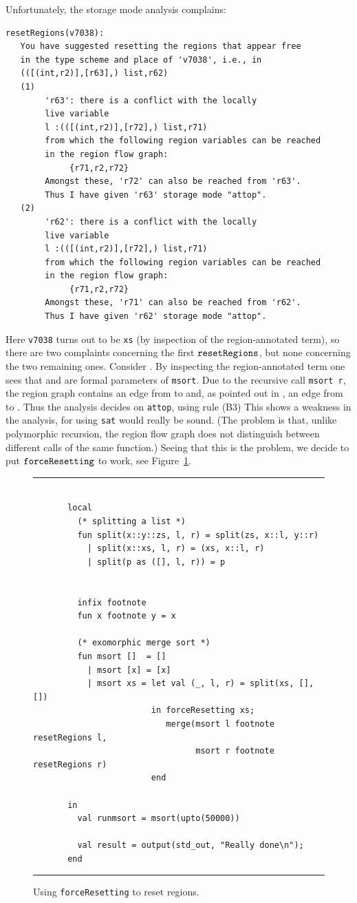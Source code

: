 \documentclass[12pt]{book}
\begin{document}
Unfortunately, the storage mode analysis complains:
\begin{verbatim}
resetRegions(v7038): 
   You have suggested resetting the regions that appear free 
   in the type scheme and place of 'v7038', i.e., in
   (([(int,r2)],[r63],) list,r62)
   (1)                                                    
        'r63': there is a conflict with the locally
        live variable
        l :(([(int,r2)],[r72],) list,r71)
        from which the following region variables can be reached 
        in the region flow graph:
             {r71,r2,r72}
        Amongst these, 'r72' can also be reached from 'r63'.
        Thus I have given 'r63' storage mode "attop".
   (2)                                                    
        'r62': there is a conflict with the locally
        live variable
        l :(([(int,r2)],[r72],) list,r71)
        from which the following region variables can be reached 
        in the region flow graph:
             {r71,r2,r72}
        Amongst these, 'r71' can also be reached from 'r62'.
        Thus I have given 'r62' storage mode "attop".
\end{verbatim}
Here {\tt v7038} turns out to be {\tt xs} (by inspection of the
region-annotated term), so there are two complaints
concerning the first $\hbox{\tt resetRegions}$, but none concerning the two remaining
ones.  Consider . By inspecting the region-annotated term
one sees that  and  are formal parameters of
{\tt msort}.  Due to the recursive call {\tt msort r}, the region
graph contains an edge from  to  and, as pointed
out in , an edge from  to . Thus the
analysis decides on {\tt attop}, using rule (B3) This shows a weakness
in the analysis, for using {\tt sat} would really be sound. (The
problem is that, unlike polymorphic recursion, the region flow graph
does not distinguish between different calls of the same function.)
Seeing that this is the problem, we decide to put $\hbox{\tt forceResetting}$ to work,
see Figure~\ref{force.fig}.
\begin{figure}
\hrule
\begin{verbatim}

       local
         (* splitting a list *)
         fun split(x::y::zs, l, r) = split(zs, x::l, y::r)
           | split(x::xs, l, r) = (xs, x::l, r)
           | split(p as ([], l, r)) = p

  
         infix footnote
         fun x footnote y = x

         (* exomorphic merge sort *)
         fun msort []  = []
           | msort [x] = [x]
           | msort xs = let val (_, l, r) = split(xs, [], [])
                        in forceResetting xs;
                           merge(msort l footnote resetRegions l, 
                                 msort r footnote resetRegions r)
                        end

       in
         val runmsort = msort(upto(50000))
 
         val result = output(std_out, "Really done\n");
       end
\end{verbatim}
\caption{Using {\tt forceResetting} to reset regions.}
\medskip
\hrule
\label{force.fig}
\end{figure}
\end{document}
